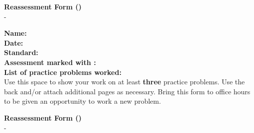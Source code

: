 \documentclass[letterpaper]{article}
\begin{document}
\begin{center}
{\Large \bf Reassessment Form (\reattemptMark{})} \\
\large \course{} - \prof
\end{center}



\vspace{0.2in}

\begin{flushleft}
{\bf Name: } \underline{\phantom{xxxxxxxxxxxxxxxxxxxxxxxxxxxxxxxxxxxxxxxxxxxxxxxxxxxxxxxxx}} \\
\vspace{0.15in}
{\bf Date: } \underline{\phantom{xxxxxxxxxxxxxxxxxxxxxxxxxxxxxxxxxxxxxxxxxxxxxxxxxxxxxxxxx}} \\
\vspace{0.15in}
{\bf Standard: } \underline{\phantom{xxxxxxxxxxxxxxxxxxx}} \\
\vspace{0.15in}
{\bf Assessment marked with \reattemptMark{}: } \underline{\phantom{xxxxxxxxxxxxxxxxxxxxxxxxxxxxx}} \\
\vspace{0.15in}
{\bf List of practice problems worked: } \\
\vspace{0.4in}
Use this space to show your work on at least {\bf three} practice problems.  Use the back and/or attach additional pages as necessary. Bring this form
to office hours to be given an opportunity to work a new problem.

\vfill


\end{flushleft}

\newpage

\begin{center}
{\Large \bf Reassessment Form (\minorMark{})} \\
\large \course{} - \prof
\end{center}



\vspace{0.2in}
\end{document}
